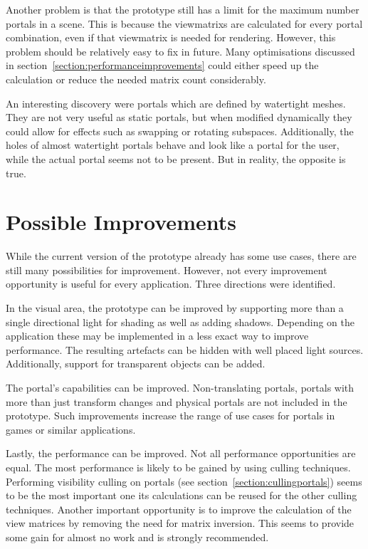 Another problem is that the prototype still has a limit for the maximum  number portals in a scene. This is because the \glspl{viewmatrix} are calculated for every portal combination, even if that \gls{viewmatrix} is needed for rendering. However, this problem should be relatively easy to fix in future. Many optimisations discussed in section~\ref{section:performanceimprovements} could either speed up the calculation or reduce the needed matrix count considerably.

An interesting discovery were portals which are defined by watertight meshes. They are not very useful as static portals, but when modified dynamically they could allow for effects such as swapping or rotating subspaces. Additionally, the holes of almost watertight portals behave and look like a portal for the user, while the actual portal seems not to be present. But in reality, the opposite is true.


\section{Possible Improvements}

While the current version of the prototype already has some use cases, there are still many possibilities for improvement. However, not every improvement opportunity is useful for every application. Three directions were identified.

In the visual area, the prototype can be improved by supporting more than a single directional light for shading as well as adding shadows. Depending on the application these may be implemented in a less exact way to improve performance. The resulting artefacts can be hidden with well placed light sources. Additionally, support for transparent objects can be added.

The portal's capabilities can be improved. Non-translating portals, portals with more than just transform changes and physical portals are not included in the prototype. Such improvements increase the range of use cases for portals in games or similar applications.

Lastly, the performance can be improved. Not all performance opportunities are equal. The most performance is likely to be gained by using culling techniques. Performing visibility culling on portals (see section~\ref{section:cullingportals}) seems to be the most important one its calculations can be reused for the other culling techniques. Another important opportunity is to improve the calculation of the view matrices by removing the need for matrix inversion. This seems to provide some gain for almost no work and is strongly recommended.

